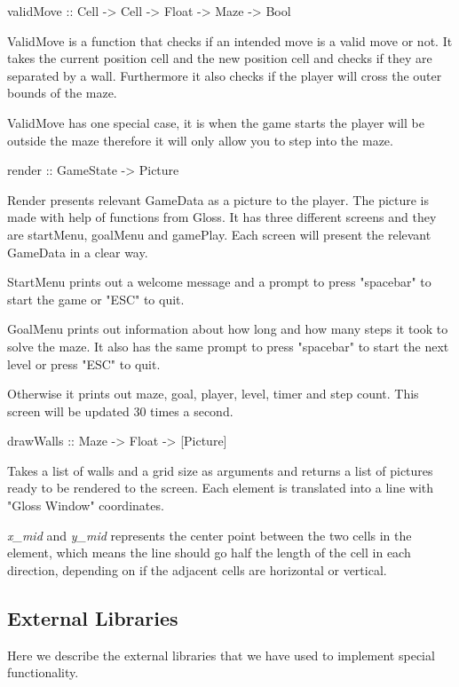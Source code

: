 \documentclass[12pt, a4paper]{article}
\begin{document}
\begin{code}
    validMove :: Cell -> Cell -> Float -> Maze -> Bool
\end{code}
ValidMove is a function that checks if an intended move is a valid move or not. It takes the current position cell and the new position cell and checks if they are separated by a wall.
Furthermore it also checks if the player will cross the outer bounds of the maze.
 
ValidMove has one special case, it is when the game starts the player will be outside the maze therefore it will only allow you to step into the maze.


\begin{code}
    render :: GameState -> Picture
\end{code}
Render presents relevant GameData as a picture to the player. The picture is made with help of functions from Gloss. It has three different screens and they are startMenu, goalMenu and gamePlay. Each screen will present the relevant GameData in a clear way.
 
StartMenu prints out a welcome message and a prompt to press "spacebar" to start the game or "ESC" to quit.
 
GoalMenu prints out information about how long and how many steps it took to solve the maze. It also has the same prompt to press "spacebar" to start the next level or press "ESC" to quit.
 
Otherwise it prints out maze, goal, player, level, timer and step count. This screen will be updated 30 times a second.


\begin{code}
drawWalls :: Maze -> Float -> [Picture]
\end{code}
Takes a list of walls and a grid size as arguments and returns a list of pictures ready to be rendered to the screen. Each element is translated into a line with "Gloss Window" coordinates. 

\textit{x\_mid} and \textit{y\_mid} represents the center point between the two cells in the element, which means the line should go half the length of the cell in each direction, depending on if the adjacent cells are horizontal or vertical.





\subsection{External Libraries}
Here we describe the external libraries that we have used to implement special functionality.
\end{document}
